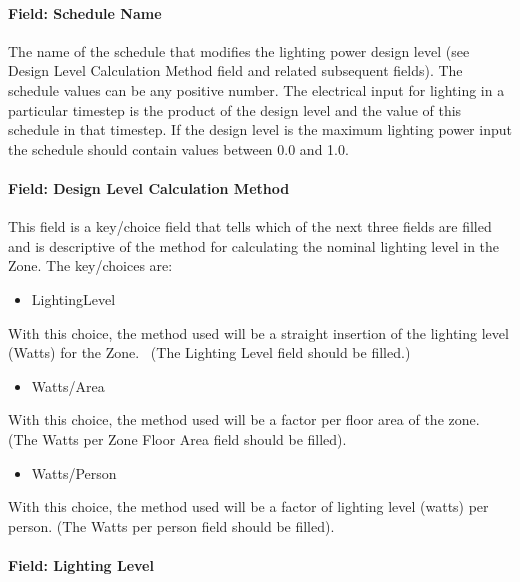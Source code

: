 \paragraph{Field: Schedule Name}\label{field-schedule-name-002}

The name of the schedule that modifies the lighting power design level (see Design Level Calculation Method field and related subsequent fields). The schedule values can be any positive number. The electrical input for lighting in a particular timestep is the product of the design level and the value of this schedule in that timestep. If the design level is the maximum lighting power input the schedule should contain values between 0.0 and 1.0.

\paragraph{Field: Design Level Calculation Method}\label{field-design-level-calculation-method}

This field is a key/choice field that tells which of the next three fields are filled and is descriptive of the method for calculating the nominal lighting level in the Zone. The key/choices are:

\begin{itemize}
\tightlist
\item
  LightingLevel
\end{itemize}

With this choice, the method used will be a straight insertion of the lighting level (Watts) for the Zone.~ (The Lighting Level field should be filled.)

\begin{itemize}
\tightlist
\item
  Watts/Area
\end{itemize}

With this choice, the method used will be a factor per floor area of the zone. (The Watts per Zone Floor Area field should be filled).

\begin{itemize}
\tightlist
\item
  Watts/Person
\end{itemize}

With this choice, the method used will be a factor of lighting level (watts) per person. (The Watts per person field should be filled).

\paragraph{Field: Lighting Level}\label{field-lighting-level}

